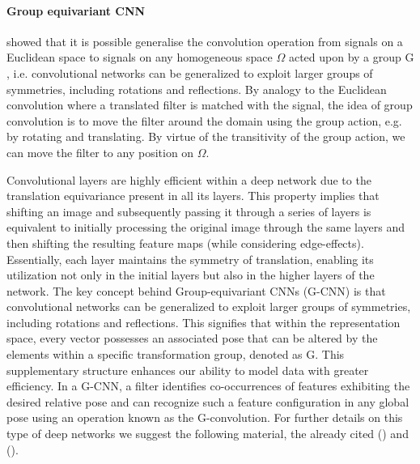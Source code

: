 \documentclass[binding=0.6cm]{sapthesis}
\newcommand{\mycite}[1]{(\cite{#1})}
\begin{document}
\paragraph{Group equivariant CNN}
\label{sec:bg.gnn.geCNN}
\cite{taco2016-geCNN} showed that it is possible generalise the convolution operation from signals on a Euclidean space to signals on any homogeneous space $\Omega$ acted upon by a group $\mathrm{G}$, i.e. convolutional networks can be generalized to exploit larger groups of symmetries, including rotations and reflections. By analogy to the Euclidean convolution where a translated filter is matched with the signal, the idea of group convolution is to move the filter around the domain using the group action, e.g. by rotating and translating. By virtue of the transitivity of the group action, we can move the filter to any position on $\Omega$.

Convolutional layers are highly efficient within a deep network due to the translation equivariance present in all its layers. This property implies that shifting an image and subsequently passing it through a series of layers is equivalent to initially processing the original image through the same layers and then shifting the resulting feature maps (while considering edge-effects). Essentially, each layer maintains the symmetry of translation, enabling its utilization not only in the initial layers but also in the higher layers of the network. The key concept behind Group-equivariant CNNs (G-CNN) is that convolutional networks can be generalized to exploit larger groups of symmetries, including rotations and reflections. This signifies that within the representation space, every vector possesses an associated pose that can be altered by the elements within a specific transformation group, denoted as G. This supplementary structure enhances our ability to model data with greater efficiency. In a G-CNN, a filter identifies co-occurrences of features exhibiting the desired relative pose and can recognize such a feature configuration in any global pose using an operation known as the G-convolution. For further details on this type of deep networks we suggest the following material, the already cited \mycite{taco2016-geCNN} and \mycite{bronstein2021geometric}.
\end{document}
